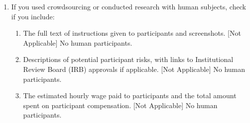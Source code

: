 \begin{enumerate}
  \item If you used crowdsourcing or conducted research with human subjects, check if you include:
  \begin{enumerate}
    \item The full text of instructions given to participants and screenshots. [Not Applicable] No human participants.
    \item Descriptions of potential participant risks, with links to Institutional Review Board (IRB) approvals if applicable. [Not Applicable] No human participants.
    \item The estimated hourly wage paid to participants and the total amount spent on participant compensation. [Not Applicable] No human participants.
  \end{enumerate}

\end{enumerate}
